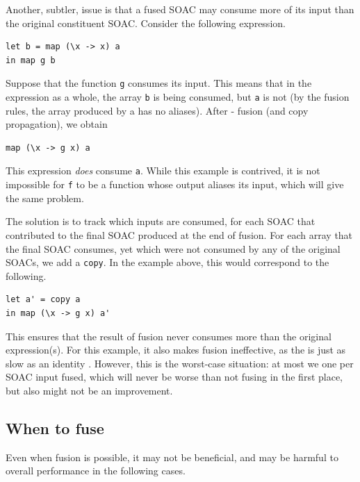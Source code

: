 Another, subtler, issue is that a fused SOAC may consume more of its
input than the original constituent SOAC.  Consider the following
expression.
\begin{lstlisting}
let b = map (\x -> x) a
in map g b
\end{lstlisting}
Suppose that the function \texttt{g} consumes its input.  This means
that in the expression as a whole, the array \texttt{b} is being
consumed, but \texttt{a} is not (by the fusion rules, the array
produced by a  has no aliases).  After -
fusion (and copy propagation), we obtain
\begin{lstlisting}
map (\x -> g x) a
\end{lstlisting}
This expression \textit{does} consume \texttt{a}.  While this example
is contrived, it is not impossible for \texttt{f} to be a function
whose output aliases its input, which will give the same problem.

The solution is to track which inputs are consumed, for each SOAC that
contributed to the final SOAC produced at the end of fusion.  For each
array that the final SOAC consumes, yet which were not consumed by any
of the original SOACs, we add a \texttt{copy}.  In the example above,
this would correspond to the following.
\begin{lstlisting}
let a' = copy a
in map (\x -> g x) a'
\end{lstlisting}%
This ensures that the result of fusion never consumes more than the
original expression(s).  For this example, it also makes fusion
ineffective, as the  is just as slow as an identity .
However, this is the worst-case situation: at most we one 
per SOAC input fused, which will never be worse than not fusing in the
first place, but also might not be an improvement.

\subsection{When to fuse}
\label{sec:whentofuse}

Even when fusion is possible, it may not be beneficial, and may be
harmful to overall performance in the following cases.

